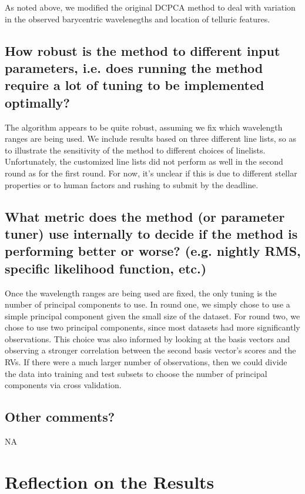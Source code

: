 \documentclass[12pt]{article}
\begin{document}
As noted above, we modified the original DCPCA method to deal with variation in the observed barycentric wavelenegths and location of telluric features.

\subsection{How robust is the method to different input parameters, i.e. does running the method require a lot of tuning to be implemented optimally?}

The algorithm appears to be quite robust, assuming we fix which wavelength ranges are being used.
We include results based on three different line lists, so as to illustrate the sensitivity of the method to different choices of linelists.
Unfortunately, the customized line lists did not perform as well in the second round as for the first round.  For now, it's unclear if this is due to different stellar properties or to human factors and rushing to submit by the deadline.

\subsection{What metric does the method (or parameter tuner) use internally to decide if the method is performing better or worse?  (e.g. nightly RMS, specific likelihood function, etc.)}

Once the  wavelength ranges are being used are fixed, the only tuning is the number of principal components to use.
In round one, we simply chose to use a simple principal component given the small size of the dataset.
For round two, we chose to use two  principal components, since most datasets had more significantly observations.  This choice was also informed by looking at the basis vectors and observing a stronger correlation between the second basis vector's scores and the RVs.
If there were a much larger number of observations, then we could divide the data into training and test subsets to choose the number of principal components via cross validation.

\subsection{Other comments?}

NA

\section{Reflection on the Results}
\end{document}
